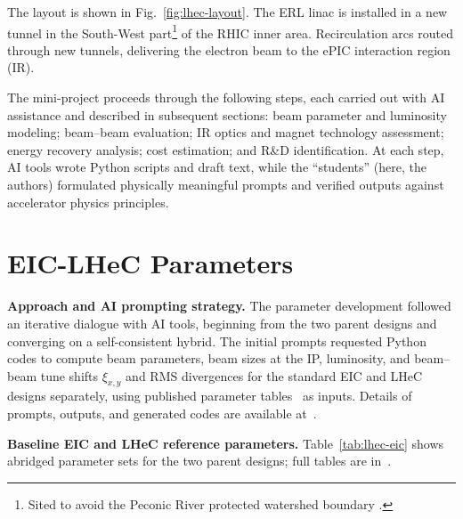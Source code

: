 \documentclass[%
               refpage,       %
               biblatex,     %
               hyphens,      %
               ]{jacow}
\begin{document}
The layout is shown in Fig.~\ref{fig:lhec-layout}. The ERL linac is 
installed in a new tunnel in the South-West part\footnote{Sited to 
avoid the Peconic River protected watershed boundary \cite{peconic-river}.} of the RHIC 
inner area. Recirculation arcs routed through new tunnels, 
delivering the electron beam to the ePIC interaction region (IR).

The mini-project proceeds through the following steps, each carried out 
with AI assistance and described in subsequent 
sections: beam parameter and luminosity modeling; beam--beam evaluation; 
IR optics and magnet technology assessment; energy recovery analysis; cost estimation; and R\&D identification. 
At each step, AI tools wrote Python scripts and draft text, while the 
``students'' (here, the authors) formulated physically meaningful prompts 
and verified outputs against accelerator physics principles.





\section{EIC-LHeC Parameters}

\textbf{Approach and AI prompting strategy.}
The parameter development followed an iterative dialogue with AI tools, 
beginning from the two parent designs and converging on a self-consistent 
hybrid. The initial prompts requested Python codes to compute beam parameters, 
beam sizes at the IP, luminosity, and beam--beam tune shifts $\xi_{x,y}$ and 
RMS divergences for the standard EIC and LHeC designs separately, using 
published parameter tables~\cite{EIC-pars,ESPP-LHeC} as inputs. Details of 
prompts, outputs, and generated codes are available at~\cite{GitHub}.


\textbf{Baseline EIC and LHeC reference parameters.}
Table~\ref{tab:lhec-eic} shows abridged parameter sets for the two parent 
designs; full tables are in~\cite{EIC-pars,ESPP-LHeC}.
\end{document}
